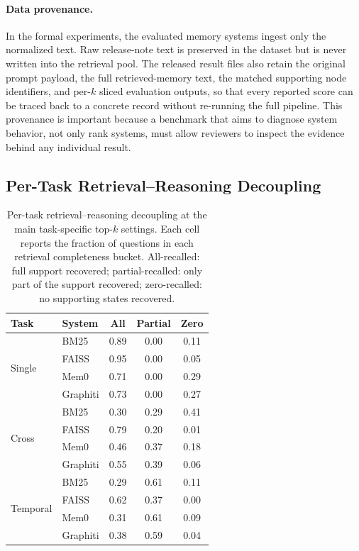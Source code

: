 \paragraph{Data provenance.}
In the formal experiments, the evaluated memory systems ingest only the normalized text. Raw release-note text is preserved in the dataset but is never written into the retrieval pool. The released result files also retain the original prompt payload, the full retrieved-memory text, the matched supporting node identifiers, and per-$k$ sliced evaluation outputs, so that every reported score can be traced back to a concrete record without re-running the full pipeline. This provenance is important because a benchmark that aims to diagnose system behavior, not only rank systems, must allow reviewers to inspect the evidence behind any individual result.

\subsection{Per-Task Retrieval--Reasoning Decoupling}


\begin{table}[t]
\centering
\scriptsize
\caption{Per-task retrieval--reasoning decoupling at the main task-specific top-$k$ settings. Each cell reports the fraction of questions in each retrieval completeness bucket. All-recalled: full support recovered; partial-recalled: only part of the support recovered; zero-recalled: no supporting states recovered.}
\label{tab:per-task-decoupling}
\setlength{\tabcolsep}{3pt}
\begin{tabular}{llccc}
\toprule
Task & System & All & Partial & Zero \\
\midrule
\multirow{4}{*}{Single}
 & BM25 & 0.89 & 0.00 & 0.11 \\
 & FAISS & 0.95 & 0.00 & 0.05 \\
 & Mem0 & 0.71 & 0.00 & 0.29 \\
 & Graphiti & 0.73 & 0.00 & 0.27 \\
\midrule
\multirow{4}{*}{Cross}
 & BM25 & 0.30 & 0.29 & 0.41 \\
 & FAISS & 0.79 & 0.20 & 0.01 \\
 & Mem0 & 0.46 & 0.37 & 0.18 \\
 & Graphiti & 0.55 & 0.39 & 0.06 \\
\midrule
\multirow{4}{*}{Temporal}
 & BM25 & 0.29 & 0.61 & 0.11 \\
 & FAISS & 0.62 & 0.37 & 0.00 \\
 & Mem0 & 0.31 & 0.61 & 0.09 \\
 & Graphiti & 0.38 & 0.59 & 0.04 \\
\bottomrule
\end{tabular}
\end{table}


